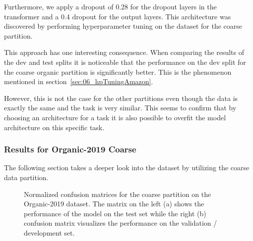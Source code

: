 Furthermore, we apply a dropout of 0.28 for the dropout layers in the transformer and a 0.4 dropout for the output layers. This architecture was discovered by performing hyperparameter tuning on the dataset for the coarse partition.
\bigskip

This approach has one interesting consequence. When comparing the results of the dev and test splits it is noticeable that the performance on the dev split for the coarse organic partition is significantly better. This is the phenomenon mentioned in section~\ref{sec:06_hpTuningAmazon}.
\smallskip

However, this is not the case for the other partitions even though the data is exactly the same and the task is very similar. This seems to confirm that by choosing an architecture for a task it is also possible to overfit the model architecture on this specific task.


\subsubsection*{Results for Organic-2019 Coarse}
The following section takes a deeper look into the dataset by utilizing the coarse data partition.


\begin{figure}[htb]
	\centering
	
	\caption{Normalized confusion matrices for the coarse partition on the Organic-2019 dataset. The matrix on the left {(a)} shows the performance of the model on the test set while the right {(b)} confusion matrix visualizes the performance on the validation / development set.}
	\label{fig:06_ORG_coarse_cmatrices}
\end{figure}


